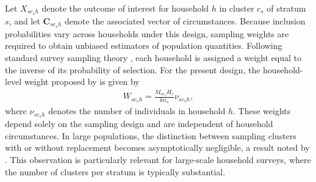 \documentclass[12pt]{article}
\theoremstyle{plain}
\theoremstyle{definition}
\begin{document}
Let $X_{sc_sh}$ denote the outcome of interest for household $h$ in cluster $c_s$ of stratum $s$, and let $\bm{C}_{sc_sh}$ 
denote the associated vector of circumstances. Because inclusion probabilities vary across households under this design, 
sampling weights are required to obtain unbiased estimators of population quantities. 
Following standard survey sampling theory \citep[e.g.,][and others]{Binder1995estimating, Horvitz1952, Lee2006}, each household is assigned a weight equal to the inverse of its probability of selection. For the present design, the household-level weight proposed by \cite{Bhattacharya2007} is given by
\begin{align}
\label{eq:weight}
W_{sc_sh}=\frac{M_{sc_s}H_s}{kn_s}\nu_{sc_sh},
\end{align}
where $\nu_{sc_sh}$ denotes the number of individuals in household $h$.
These weights depend solely on the sampling design and are independent of household circumstances. In large populations, the distinction between sampling clusters with or without replacement becomes asymptotically negligible, a result noted by \citet{Bhattacharya2004, Bhattacharya2007}. This observation is particularly relevant for large-scale household surveys, where the number of clusters per stratum is typically substantial.
\end{document}
